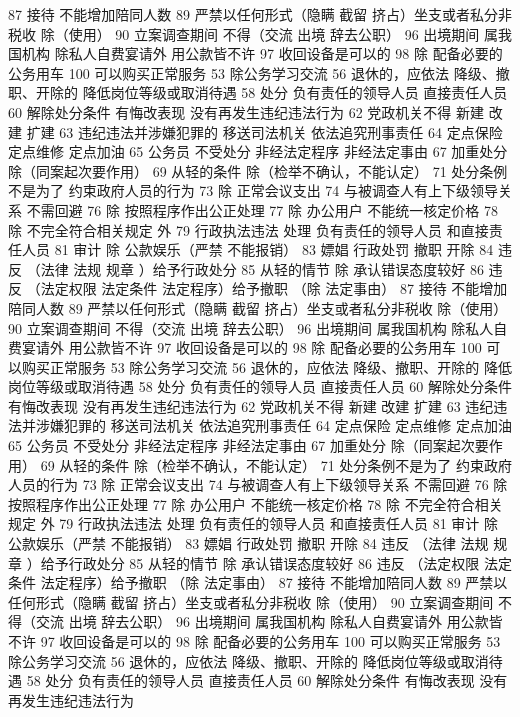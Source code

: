 \documentclass[11pt]{ctexart}
\begin{document}
87 接待 不能增加陪同人数
89 严禁以任何形式（隐瞒 截留 挤占）坐支或者私分非税收
除（使用）
90 立案调查期间 不得（交流 出境 辞去公职）
96 出境期间 属我国机构 除私人自费宴请外 用公款皆不许
97 收回设备是可以的
98 除 配备必要的公务用车
100 可以购买正常服务
53 除公务学习交流
56 退休的，应依法
降级、撤职、开除的 降低岗位等级或取消待遇
58 处分
负有责任的领导人员
直接责任人员
60 解除处分条件
有悔改表现
没有再发生违纪违法行为
62 党政机关不得
新建 改建 扩建
63 违纪违法并涉嫌犯罪的
移送司法机关
依法追究刑事责任
64 定点保险 定点维修 定点加油
65 公务员 不受处分
非经法定程序
非经法定事由
67 加重处分
除（同案起次要作用）
69 从轻的条件
除（检举不确认，不能认定）
71 处分条例不是为了
约束政府人员的行为
73 除 正常会议支出
74 与被调查人有上下级领导关系 不需回避
76 除 按照程序作出公正处理
77 除 办公用户
不能统一核定价格
78 除 不完全符合相关规定 外
79 行政执法违法 处理
负有责任的领导人员
和直接责任人员
81 审计
除 公款娱乐（严禁 不能报销）
83 嫖娼 行政处罚
撤职 开除
84 违反 （法律 法规 规章 ）给予行政处分
85 从轻的情节
除 承认错误态度较好
86 违反 （法定权限 法定条件 法定程序）给予撤职
（除 法定事由）
87 接待 不能增加陪同人数
89 严禁以任何形式（隐瞒 截留 挤占）坐支或者私分非税收
除（使用）
90 立案调查期间 不得（交流 出境 辞去公职）
96 出境期间 属我国机构 除私人自费宴请外 用公款皆不许
97 收回设备是可以的
98 除 配备必要的公务用车
100 可以购买正常服务
53 除公务学习交流
56 退休的，应依法
降级、撤职、开除的 降低岗位等级或取消待遇
58 处分
负有责任的领导人员
直接责任人员
60 解除处分条件
有悔改表现
没有再发生违纪违法行为
62 党政机关不得
新建 改建 扩建
63 违纪违法并涉嫌犯罪的
移送司法机关
依法追究刑事责任
64 定点保险 定点维修 定点加油
65 公务员 不受处分
非经法定程序
非经法定事由
67 加重处分
除（同案起次要作用）
69 从轻的条件
除（检举不确认，不能认定）
71 处分条例不是为了
约束政府人员的行为
73 除 正常会议支出
74 与被调查人有上下级领导关系 不需回避
76 除 按照程序作出公正处理
77 除 办公用户
不能统一核定价格
78 除 不完全符合相关规定 外
79 行政执法违法 处理
负有责任的领导人员
和直接责任人员
81 审计
除 公款娱乐（严禁 不能报销）
83 嫖娼 行政处罚
撤职 开除
84 违反 （法律 法规 规章 ）给予行政处分
85 从轻的情节
除 承认错误态度较好
86 违反 （法定权限 法定条件 法定程序）给予撤职
（除 法定事由）
87 接待 不能增加陪同人数
89 严禁以任何形式（隐瞒 截留 挤占）坐支或者私分非税收
除（使用）
90 立案调查期间 不得（交流 出境 辞去公职）
96 出境期间 属我国机构 除私人自费宴请外 用公款皆不许
97 收回设备是可以的
98 除 配备必要的公务用车
100 可以购买正常服务
53 除公务学习交流
56 退休的，应依法
降级、撤职、开除的 降低岗位等级或取消待遇
58 处分
负有责任的领导人员
直接责任人员
60 解除处分条件
有悔改表现
没有再发生违纪违法行为
\end{document}
